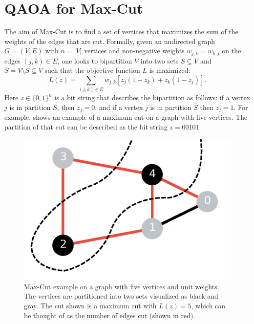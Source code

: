 \chapter{QAOA for Max-Cut}
The aim of Max-Cut is to find a set of vertices that maximizes the sum of the weights of the edges that are cut.
Formally, given an undirected graph $G = (V, E)$ with $n = |V|$ vertices and non-negative weights $w_{j, k} = w_{k, j}$ on the edges $(j, k) \in E$, one looks to bipartition $V$ into two sets $S \subseteq V$ and $\bar{S} = V \setminus S \subseteq V$ such that the objective function $L$ is maximized:
\begin{equation} \label{eqn:max-cut-objective}
L(z) = \sum_{(j, k) \in E} w_{j, k}[z_j(1 - z_k) + z_k(1 - z_j)].
\end{equation}
Here $z \in \{0, 1\}^n$ is a bit string that describes the bipartition as follows: if a vertex $j$ is in partition $S$, then $z_j = 0$, and if a vertex $j$ is in partition $\bar{S}$ then $z_j = 1$.
For example,  shows an example of a maximum cut on a graph with five vertices.
The partition of that cut can be described as the bit string $z = 00101$.
\begin{figure}[ht]
    \centering
    \includegraphics[width=0.4\linewidth]{figures/maxcut_5_graph_cut_example.pdf}
    \caption[Max-Cut example on a graph with five vertices and unit weights.]{
        Max-Cut example on a graph with five vertices and unit weights.
        The vertices are partitioned into two sets visualized as black and gray.
        The cut shown is a maximum cut with $L(z) = 5$, which can be thought of as the number of edges cut (shown in red).
    }
    \label{fig:maxcut-5-example}
\end{figure}

